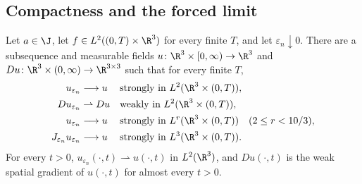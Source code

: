 \documentclass[11pt,reqno]{amsart}
\begin{document}
\subsection{Compactness and the forced limit}

\begin{proposition}\label{prop:forced-limit}
Let $a\in\J$, let $f\in L^2((0,T)\times\R^3)$ for every finite $T$, and
let $\varepsilon_n\downarrow0$. There are a subsequence and measurable
fields $u\colon\R^3\times[0,\infty)\to\R^3$ and
$Du\colon\R^3\times(0,\infty)\to\R^{3\times3}$ such that for every
finite $T$,
\begin{align}
 u_{\varepsilon_n}&\longrightarrow u
       &&\text{strongly in }L^2(\R^3\times(0,T)),\label{eq:forced-limit-L2}\\
 Du_{\varepsilon_n}&\rightharpoonup Du
       &&\text{weakly in }L^2(\R^3\times(0,T)),\label{eq:forced-limit-Du}\\
 u_{\varepsilon_n}&\longrightarrow u
       &&\text{strongly in }L^r(\R^3\times(0,T))\quad(2\le r<10/3),
       \label{eq:forced-limit-Lr}\\
 J_{\varepsilon_n}u_{\varepsilon_n}&\longrightarrow u
       &&\text{strongly in }L^3(\R^3\times(0,T)).\label{eq:forced-limit-JL3}
\end{align}
For every $t>0$, $u_{\varepsilon_n}(\cdot,t)\rightharpoonup u(\cdot,t)$
in $L^2(\R^3)$, and $Du(\cdot,t)$ is the weak spatial gradient of
$u(\cdot,t)$ for almost every $t>0$.
\end{proposition}
\end{document}
